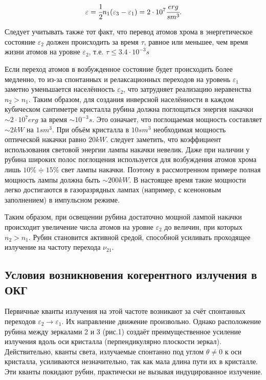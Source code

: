 \documentclass[a4paper,14pt,russian]{article}
\begin{document}
\begin{eqnarray}
\varepsilon = \cfrac {1} {2} n_1 (\varepsilon_3 - \varepsilon_1) = 2 \cdot 10^7 \cfrac {erg} {sm^3}.
\end{eqnarray}

Следует учитывать также тот факт, что перевод атомов хрома в энергетическое состояние $\varepsilon_2$ должен происходить за время $\tau$, равное или меньшее, чем время жизни атомов на уровне $\varepsilon_2$, т.е. $\tau \leqslant 3.4 \cdot 10^{-3} s$

Если переход атомов в возбужденное состояние будет происходить более медленно, то из-за спонтанных и релаксационных переходов на уровень $\varepsilon_1$ заметно уменьшается населённость $\varepsilon_2$, что затрудняет реализацию неравенства $n_2 > n_1$. Таким образом, для создания инверсной населённости в каждом кубическом сантиметре кристалла рубина должна поглощаться энергия накачки $\sim 2 \cdot 10^7 erg$ за время $\sim 10^{-3} s$. Это означает, что поглощаемая мощность составляет $\sim 2 kW$ на $1 sm^3$. При объём кристалла в $10 sm^3$ необходимая мощность оптической накачки равно $20 kW$. следует заметить, что коэффициент использования световой энергии лампы накачки невелик. Даже при наличии у рубина широких полос поглощения используется для возбуждения атомов хрома лишь $10\% \Doteq 15\%$ свет лампы накачки. Поэтому в рассмотренном примере полная мощность лампы должна быть $\sim 200 kW$. В настоящее время такие мощности легко достигаются в газоразрядных лампах (например, с ксеноновым заполнением) в импульсном режиме.

Таким образом, при освещении рубина достаточно мощной лампой накачки происходит увеличение числа атомов на уровне $\varepsilon_2$ до величин, при которых $n_2 > n_1$. Рубин становится активной средой, способной усиливать проходящее излучение на частоту перехода $\nu_{21}$.

\subsection {Условия возникновения когерентного излучения в ОКГ}

Первичные кванты излучения на этой частоте возникают за счёт спонтанных переходов $\varepsilon_2 \to \varepsilon_1$. Их направление движение произвольно. Однако расположение рубина между зеркалами 2 и 3 (рис.1) создаёт преимущественное усиление излучения вдоль оси кристалла (перпендикулярно плоскости зеркал). Действительно, кванты света, излучаемые спонтанно под углом $\theta \ne 0$ к оси кристалла, усиливаются незначительно, так как мала длина пути их в кристалле. Эти кванты покидают рубин, практически не вызывая индуцированное излучение.
\end{document}
